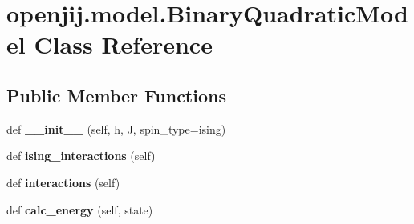 \hypertarget{classopenjij_1_1model_1_1_binary_quadratic_model}{}\section{openjij.\+model.\+Binary\+Quadratic\+Model Class Reference}
\label{classopenjij_1_1model_1_1_binary_quadratic_model}
\subsection*{Public Member Functions}
\begin{DoxyCompactItemize}
\item 
\mbox{\label{classopenjij_1_1model_1_1_binary_quadratic_model_a9ebe3870abb56965577080d0be92d906}} 
def {\bfseries \+\_\+\+\_\+init\+\_\+\+\_\+} (self, h, J, spin\+\_\+type=\textquotesingle{}ising\textquotesingle{})
\item 
\mbox{\label{classopenjij_1_1model_1_1_binary_quadratic_model_a0fdbb677c68a7afdd60144bb4831294f}} 
def {\bfseries ising\+\_\+interactions} (self)
\item 
\mbox{\label{classopenjij_1_1model_1_1_binary_quadratic_model_a23dd14c43047e5d241711ddd1e5b9716}} 
def {\bfseries interactions} (self)
\item 
\mbox{\label{classopenjij_1_1model_1_1_binary_quadratic_model_af5d386b5d3d2fbabeafc5b817763a1a6}} 
def {\bfseries calc\+\_\+energy} (self, state)
\end{DoxyCompactItemize}
